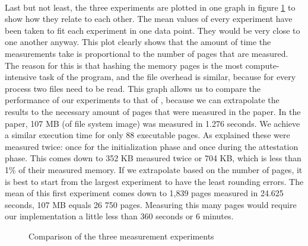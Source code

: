 \paragraph*{}
Last but not least, the three experiments are plotted in one graph in figure \ref{last} to show how they relate to each other. The mean values of every experiment have been taken to fit each experiment in one data point. They would be very close to one another anyway. This plot clearly shows that the amount of time the measurements take is proportional to the number of pages that are measured. The reason for this is that hashing the memory pages is the most compute-intensive task of the program, and the file overhead is similar, because for every process two files need to be read. This graph allows us to compare the performance of our experiments to that of \cite{LingZhen2021Sbtb}, because we can extrapolate the results to the necessary amount of pages that were measured in the paper. In the paper, 107 MB (of file system image) was measured in 1.276 seconds. We achieve a similar execution time for only 88 executable pages. As explained these were measured twice: once for the initialization phase and once during the attestation phase. This comes down to 352 KB measured twice or 704 KB, which is less than 1\% of their measured memory. If we extrapolate based on the number of pages, it is best to start from the largest experiment to have the least rounding errors. The mean of this first experiment comes down to 1,839 pages measured in 24.625 seconds, 107 MB equals 26 750 pages. Measuring this many pages would require our implementation a little less than 360 seconds or 6 minutes. 

\begin{figure}[h!]
\caption{Comparison of the three measurement experiments}
\label{last}
\end{figure}


